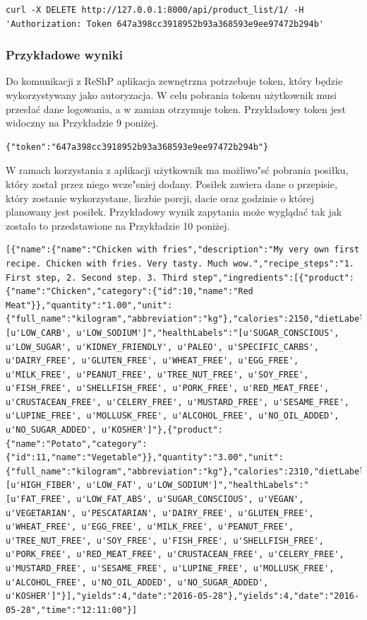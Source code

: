 \documentclass{article}
\begin{document}
\begin{lstlisting}[label=product_api,caption=Usuwanie produktu,breaklines=true]
curl -X DELETE http://127.0.0.1:8000/api/product_list/1/ -H 'Authorization: Token 647a398cc3918952b93a368593e9ee97472b294b'
\end{lstlisting}

\subsubsection{Przykładowe wyniki}
Do komunikacji z ReShP aplikacja zewnętrzna potrzebuje token, który będzie wykorzystywany jako autoryzacja. W celu pobrania tokenu użytkownik musi przesłać dane logowania, a w zamian otrzymuje token. Przykładowy token jest widoczny na Przykładzie 9 poniżej.

\begin{lstlisting}[label=token_api,caption=Pobranie tokenu,breaklines=true]
{"token":"647a398cc3918952b93a368593e9ee97472b294b"}
\end{lstlisting}

W ramach korzystania z aplikacji użytkownik ma możliwo"sć pobrania posiłku, który został przez niego wcze"sniej dodany. Posiłek zawiera dane o przepisie, który zostanie wykorzystane, liczbie porcji, dacie oraz godzinie o której planowany jest posiłek. Przykładowy wynik zapytania może wyglądać tak jak zostało to przedstawione na Przykładzie 10 poniżej.

\begin{lstlisting}[label=meal_api,caption=Pobranie posiłku,breaklines=true]
[{"name":{"name":"Chicken with fries","description":"My very own first recipe. Chicken with fries. Very tasty. Much wow.","recipe_steps":"1. First step, 2. Second step. 3. Third step","ingredients":[{"product":{"name":"Chicken","category":{"id":10,"name":"Red Meat"}},"quantity":"1.00","unit":{"full_name":"kilogram","abbreviation":"kg"},"calories":2150,"dietLabels":"[u'LOW_CARB', u'LOW_SODIUM']","healthLabels":"[u'SUGAR_CONSCIOUS', u'LOW_SUGAR', u'KIDNEY_FRIENDLY', u'PALEO', u'SPECIFIC_CARBS', u'DAIRY_FREE', u'GLUTEN_FREE', u'WHEAT_FREE', u'EGG_FREE', u'MILK_FREE', u'PEANUT_FREE', u'TREE_NUT_FREE', u'SOY_FREE', u'FISH_FREE', u'SHELLFISH_FREE', u'PORK_FREE', u'RED_MEAT_FREE', u'CRUSTACEAN_FREE', u'CELERY_FREE', u'MUSTARD_FREE', u'SESAME_FREE', u'LUPINE_FREE', u'MOLLUSK_FREE', u'ALCOHOL_FREE', u'NO_OIL_ADDED', u'NO_SUGAR_ADDED', u'KOSHER']"},{"product":{"name":"Potato","category":{"id":11,"name":"Vegetable"}},"quantity":"3.00","unit":{"full_name":"kilogram","abbreviation":"kg"},"calories":2310,"dietLabels":"[u'HIGH_FIBER', u'LOW_FAT', u'LOW_SODIUM']","healthLabels":"[u'FAT_FREE', u'LOW_FAT_ABS', u'SUGAR_CONSCIOUS', u'VEGAN', u'VEGETARIAN', u'PESCATARIAN', u'DAIRY_FREE', u'GLUTEN_FREE', u'WHEAT_FREE', u'EGG_FREE', u'MILK_FREE', u'PEANUT_FREE', u'TREE_NUT_FREE', u'SOY_FREE', u'FISH_FREE', u'SHELLFISH_FREE', u'PORK_FREE', u'RED_MEAT_FREE', u'CRUSTACEAN_FREE', u'CELERY_FREE', u'MUSTARD_FREE', u'SESAME_FREE', u'LUPINE_FREE', u'MOLLUSK_FREE', u'ALCOHOL_FREE', u'NO_OIL_ADDED', u'NO_SUGAR_ADDED', u'KOSHER']"}],"yields":4,"date":"2016-05-28"},"yields":4,"date":"2016-05-28","time":"12:11:00"}]
\end{lstlisting}
\end{document}

